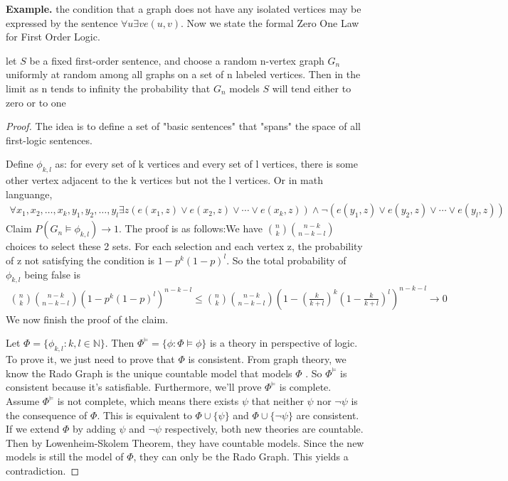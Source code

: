 \documentclass[a4paper, linespread=1.5]{article}
\begin{document}
    \textbf{Example.}  the condition that a graph does not have any isolated vertices may be expressed by the sentence $\forall u \exists v e(u,v)$.
    Now we state the formal Zero One Law for First Order Logic.
    \begin{customthm}{1}
        let $S$ be a fixed first-order sentence, and choose a random n-vertex graph $G_n$ uniformly at random among all graphs on a set of n labeled vertices.
        Then in the limit as n tends to infinity the probability that $G_n$ models $S$ will tend either to zero or to one
    \end{customthm}
    \begin{proof}
        The idea is to define a set of "basic sentences" that "spans" the space of all first-logic sentences.

        Define $\phi_{k,l}$ as: for every set of k vertices and every set of l vertices, there is some other vertex adjacent to the k vertices but not the l vertices.
        Or in math languange,
        \begin{align*}
             \forall x_1,x_2,\dots,x_k,y_1,y_2,\dots,y_l \exists z (e(x_1,z)\lor e(x_2,z)\lor \cdots \lor e(x_k,z))\land \neg(e(y_1,z)\lor e(y_2,z)\lor \cdots \lor e(y_l,z))
        \end{align*}
        Claim $P(G_n\models \phi_{k,l})\to 1$.
        The proof is as follows:We have $\binom{n}{k}\binom{n-k}{n-k-l}$ choices to select these 2 sets.
        For each selection and each vertex z, the probability of z not satisfying the condition is $1-p^k (1-p)^l$.
        So the total probability of $\phi_{k,l}$ being false is
        \begin{align*}
            \binom{n}{k}\binom{n-k}{n-k-l}(1-p^k (1-p)^l)^{n-k-l}\le \binom{n}{k}\binom{n-k}{n-k-l}(1-(\frac{k}{k+l})^k (1-\frac{k}{k+l})^l)^{n-k-l}\to 0
        \end{align*}
        We now finish the proof of the claim.

        Let $\Phi=\{\phi_{k,l}:k,l\in\mathbb{N}\}$.
        Then $\Phi^{\models} =\{\phi : \Phi \models \phi\}$ is a theory in perspective of logic.
        To prove it, we just need to prove that $\Phi $ is consistent.
        From graph theory, we know the Rado Graph is the unique countable model that models $\Phi$ .
        So $\Phi^\models$ is consistent because it's satisfiable.
        Furthermore, we'll prove $\Phi^\models$ is complete.
        Assume $\Phi^\models$ is not complete, which means there exists $\psi$ that neither $\psi$ nor $\neg \psi$ is the consequence of $\Phi$.
        This is equivalent to $\Phi \cup \{\psi\}$ and $\Phi \cup \{\neg\psi\}$ are consistent.
        If we extend $\Phi$ by adding $\psi$ and $\neg\psi$ respectively, both new theories are countable.
        Then by Lowenheim-Skolem Theorem, they have countable models.
        Since the new models is still the model of $\Phi$, they can only be the Rado Graph.
        This yields a contradiction.


\end{proof}
\end{document}
